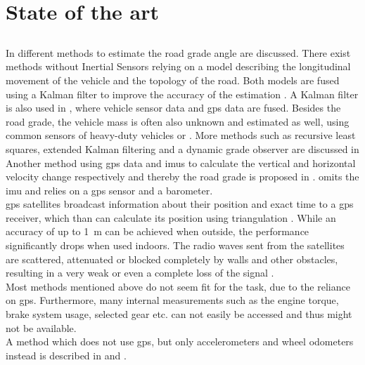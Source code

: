 \chapter{State of the art}
\label{ch:StateOfTheArt}

\section{}
In \cite{Jauch2018} different methods to estimate the road grade angle are discussed.
There exist methods without Inertial Sensors relying on a model describing the longitudinal movement of the vehicle and the topology of the road.
Both models are fused using a Kalman filter to improve the accuracy of the estimation \cite{Sahlholm2007}.
A Kalman filter is also used in \cite{Sahlholm2010}, where vehicle sensor data and \gls{gps} data are fused.
Besides the road grade, the vehicle mass is often also unknown and estimated as well, using common sensors of heavy-duty vehicles \cite{Sahlholm2010}  or  \cite{Maleej2014}.
More methods such as recursive least squares, extended Kalman filtering and a dynamic grade observer are discussed in \cite{Kidambi2014}
Another method using \gls{gps} data and \gls{imu}s to calculate the vertical and horizontal velocity change respectively and thereby the road grade is proposed in \cite{Ryu2004}.
\cite{YazdaniBoroujeni2014} omits the \gls{imu} and relies on a \gls{gps} sensor and a barometer.\\
\gls{gps} satellites broadcast information about their position and exact time to a \gls{gps} receiver, which than can calculate its position using triangulation \cite{Mainetti2014}.
While an accuracy of up to \SI{1}{\metre} can be achieved when outside, the performance significantly drops when used indoors.
The radio waves sent from the satellites are scattered, attenuated or blocked completely by walls and other obstacles, resulting in a very weak or even a complete loss of the signal \cite{Ozdenizci2015}.\\
Most methods mentioned above do not seem fit for the task, due to the reliance on \gls{gps}.
Furthermore, many internal measurements such as the engine torque, brake system usage, selected gear etc. can not easily be accessed and thus might not be available.\\
A method which does not use \gls{gps}, but only accelerometers and wheel odometers instead is described in \cite{Nilsson2012} and \cite{Palella2016}.
